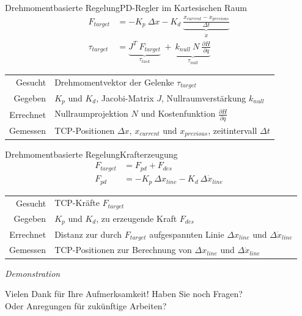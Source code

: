 \documentclass[
  german,            %
  aspectratio=169,    %
]{tumbeamer}
\begin{document}
\begin{frame}{Drehmomentbasierte Regelung}{PD-Regler im Kartesischen Raum}
  \centering
  \begin{align}
    F_{target} &= - K_p \ \Delta x - K_d \ \underbrace{\frac{x_{current} - x_{previous}}{\Delta t}}_{\dot{x}} \\
      \tau_{target} &= \underbrace{J^T \ F_{target}}_{\tau_{task}} \ + \ \underbrace{k_{null} \ N \ \frac{\partial H}{\partial q}}_{\tau_{null}}
  \end{align}
  \begin{tabular}{r@{: }l}
    Gesucht & Drehmomentvektor der Gelenke $\tau_{target}$ \\
    Gegeben & $K_p$ und $K_d$, Jacobi-Matrix $J$, Nullraumverstärkung $k_{null}$ \\
    Errechnet & Nullraumprojektion $N$ und Kostenfunktion $\frac{\partial H}{\partial q}$ \\
    Gemessen & TCP-Positionen $\Delta x$, $x_{current}$ und $x_{previous}$, zeitintervall $\Delta t$
  \end{tabular}
  \vfill
\end{frame}

\begin{frame}{Drehmomentbasierte Regelung}{Krafterzeugung}
  \centering
  \begin{align}
    F_{target} &= F_{pd} + F_{des} \\
    F_{pd} &= - K_p \ \Delta x_{line} - K_d \ \Delta \dot{x}_{line}
  \end{align}
  \begin{tabular}{r@{: }l}
    Gesucht & TCP-Kräfte $F_{target}$ \\
    Gegeben & $K_p$ und $K_d$, zu erzeugende Kraft $F_{des}$ \\
    Errechnet & Distanz zur durch $F_{target}$ aufgespannten Linie $\Delta x_{line}$ und $\Delta \dot{x}_{line}$ \\
    Gemessen & TCP-Positionen zur Berechnung von $\Delta x_{line}$ und $\Delta \dot{x}_{line}$
  \end{tabular}
  \vfill
  \textit{Demonstration}
\end{frame}

\begin{frame}{Vielen Dank für Ihre Aufmerksamkeit!}
  \centering
  \vfill
  \Large{Haben Sie noch Fragen?\\
  Oder Anregungen für zukünftige Arbeiten?}
  \vfill
\end{frame}
\end{document}
